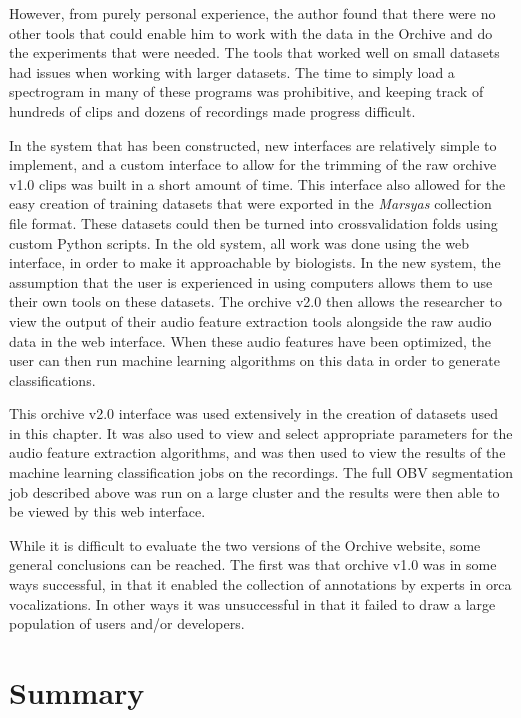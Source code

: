 \documentclass[12pt,oneside]{book}
\begin{document}
However, from purely personal experience, the author found that there
were no other tools that could enable him to work with the data in the
Orchive and do the experiments that were needed.  The tools that
worked well on small datasets had issues when working with larger
datasets.  The time to simply load a spectrogram in many of these
programs was prohibitive, and keeping track of hundreds of clips and
dozens of recordings made progress difficult.

In the system that has been constructed, new interfaces are relatively
simple to implement, and a custom interface to allow for the trimming
of the raw orchive v1.0 clips was built in a short amount of time.
This interface also allowed for the easy creation of training datasets
that were exported in the \textit{Marsyas} collection file format.  These
datasets could then be turned into crossvalidation folds using custom
Python scripts.  In the old system, all work was done using the web
interface, in order to make it approachable by biologists.  In the new
system, the assumption that the user is experienced in using computers
allows them to use their own tools on these datasets.  The orchive v2.0
then allows the researcher to view the output of their audio feature
extraction tools alongside the raw audio data in the web interface.
When these audio features have been optimized, the user can then run
machine learning algorithms on this data in order to generate
classifications.

This orchive v2.0 interface was used extensively in the creation of
datasets used in this chapter.  It was also used to view and select
appropriate parameters for the audio feature extraction algorithms,
and was then used to view the results of the machine learning
classification jobs on the recordings.  The full OBV segmentation job
described above was run on a large cluster and the results were then
able to be viewed by this web interface.

While it is difficult to evaluate the two versions of the Orchive
website, some general conclusions can be reached.  The first was that
orchive v1.0 was in some ways successful, in that it enabled the
collection of \totalAnnotations annotations by experts in orca
vocalizations.  In other ways it was unsuccessful in that it failed to
draw a large population of users and/or developers.


\section{Summary}
\label{sec:evaluation:summary}
\end{document}
